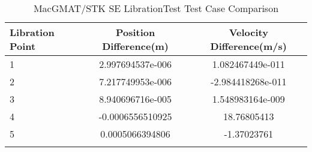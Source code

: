 \begin{table}[htbp!]
\centering
\caption{ MacGMAT/STK SE LibrationTest Test Case Comparison}
      \begin{tabular}{lcc}
      \hline\hline
          Libration Point & Position Difference(m) & Velocity Difference(m/s) \\
         \hline
         1 & 2.997694537e-006 & 1.082467449e-011 \\
         2 & 7.217749953e-006 & -2.984418268e-011 \\
         3 & 8.940696716e-005 & 1.548983164e-009 \\
         4 & -0.0006556510925 & 18.76805413 \\
         5 & 0.0005066394806 & -1.37023761 \\
      \hline\hline
      \label{Table: SE LibrationTest Table} 
\end{tabular}
\end{table}
